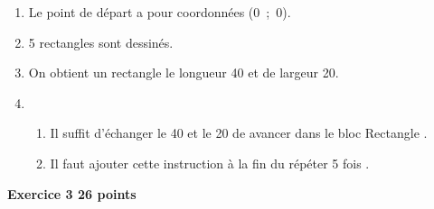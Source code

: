 \documentclass[10pt]{article}
\begin{document}
\begin{enumerate}
\item %

Le point de départ a pour coordonnées (0~;~0).
\item %
5 rectangles sont dessinés.
\item %
On obtient un rectangle le longueur 40 et de largeur 20.
\item 
	\begin{enumerate}
		\item %

Il suffit d'échanger le 40 et le 20 de \og avancer\fg{} dans le bloc \og Rectangle \fg{}.
		\item %
		
Il faut ajouter cette instruction à la fin du \og répéter 5 fois \fg.
	\end{enumerate}
\end{enumerate}

\vspace{0.5cm}

\textbf{Exercice 3 \hfill 26 points}
\end{document}
